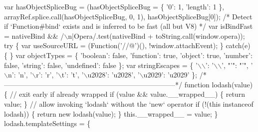 \begin{DoxyCodeInclude}
\textcolor{stringliteral}{}
\textcolor{stringliteral}{  var hasObjectSpliceBug = (hasObjectSpliceBug = \{ '0': 1, 'length': 1 \},}
\textcolor{stringliteral}{    arrayRef.splice.call(hasObjectSpliceBug, 0, 1), hasObjectSpliceBug[0]);}
\textcolor{stringliteral}{}
\textcolor{stringliteral}{}
\textcolor{stringliteral}{  /* Detect if `Function#bind` exists and is inferred to be fast (all but V8) */}
\textcolor{stringliteral}{  var isBindFast = nativeBind && /\(\backslash\)n|Opera/.test(nativeBind + toString.call(window.opera));}
\textcolor{stringliteral}{}
\textcolor{stringliteral}{  try \{}
\textcolor{stringliteral}{    var useSourceURL = (Function('//@')(), !window.attachEvent);}
\textcolor{stringliteral}{  \} catch(e) \{ \}}
\textcolor{stringliteral}{}
\textcolor{stringliteral}{  var objectTypes = \{}
\textcolor{stringliteral}{    'boolean': false,}
\textcolor{stringliteral}{    'function': true,}
\textcolor{stringliteral}{    'object': true,}
\textcolor{stringliteral}{    'number': false,}
\textcolor{stringliteral}{    'string': false,}
\textcolor{stringliteral}{    'undefined': false}
\textcolor{stringliteral}{  \};}
\textcolor{stringliteral}{}
\textcolor{stringliteral}{  var stringEscapes = \{}
\textcolor{stringliteral}{    '\(\backslash\)\(\backslash\)': '\(\backslash\)\(\backslash\)',}
\textcolor{stringliteral}{    "}\textcolor{stringliteral}{'": "'}\textcolor{stringliteral}{",}
\textcolor{stringliteral}{    '\(\backslash\)n': 'n',}
\textcolor{stringliteral}{    '\(\backslash\)r': 'r',}
\textcolor{stringliteral}{    '\(\backslash\)t': 't',}
\textcolor{stringliteral}{    '\(\backslash\)u2028': 'u2028',}
\textcolor{stringliteral}{    '\(\backslash\)u2029': 'u2029'}
\textcolor{stringliteral}{  \};}
\textcolor{stringliteral}{}
\textcolor{stringliteral}{  /*--------------------------------------------------------------------------*/}
\textcolor{stringliteral}{}
\textcolor{stringliteral}{  function lodash(value) \{}
\textcolor{stringliteral}{    // exit early if already wrapped}
\textcolor{stringliteral}{    if (value && value.\_\_wrapped\_\_) \{}
\textcolor{stringliteral}{      return value;}
\textcolor{stringliteral}{    \}}
\textcolor{stringliteral}{    // allow invoking `lodash` without the `new` operator}
\textcolor{stringliteral}{    if (!(this instanceof lodash)) \{}
\textcolor{stringliteral}{      return new lodash(value);}
\textcolor{stringliteral}{    \}}
\textcolor{stringliteral}{    this.\_\_wrapped\_\_ = value;}
\textcolor{stringliteral}{  \}}
\textcolor{stringliteral}{}
\textcolor{stringliteral}{  lodash.templateSettings = \{}
\textcolor{stringliteral}{}

\end{DoxyCodeInclude}
